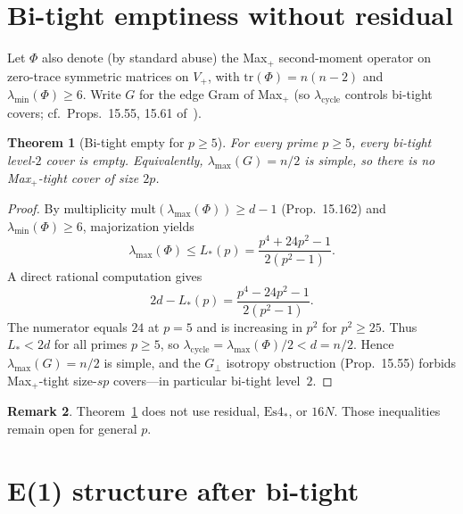 \documentclass[11pt,a4paper]{article}
\theoremstyle{plain}
\newtheorem{theorem}{Theorem}[section]
\theoremstyle{definition}
\newtheorem{remark}[theorem]{Remark}
\begin{document}
\section{Bi-tight emptiness without residual}
\label{sec:bitight}

Let $\Phi$ also denote (by standard abuse) the Max$_+$ second-moment operator on zero-trace
symmetric matrices on $V_+$, with $\mathrm{tr}(\Phi)=n(n-2)$ and $\lambda_{\min}(\Phi)\ge6$.
Write $G$ for the edge Gram of Max$_+$ (so $\lambda_{\mathrm{cycle}}$ controls bi-tight
covers; cf.\ Props.\ 15.55, 15.61 of~\cite{solution-repo}).

\begin{theorem}[Bi-tight empty for $p\ge5$]
\label{thm:bitight}
For every prime $p\ge5$, every bi-tight level-$2$ cover is empty. Equivalently,
$\lambda_{\max}(G)=n/2$ is simple, so there is no Max$_+$-tight cover of size $2p$.
\end{theorem}

\begin{proof}
By multiplicity mult$(\lambda_{\max}(\Phi))\ge d-1$ (Prop.\ 15.162) and
$\lambda_{\min}(\Phi)\ge6$, majorization yields
\begin{equation}
\label{eq:Lstar}
\lambda_{\max}(\Phi)\le L_*(p)=\frac{p^4+24p^2-1}{2(p^2-1)}.
\end{equation}
A direct rational computation gives
\[
2d-L_*(p)=\frac{p^4-24p^2-1}{2(p^2-1)}.
\]
The numerator equals $24$ at $p=5$ and is increasing in $p^2$ for $p^2\ge25$.
Thus $L_*<2d$ for all primes $p\ge5$, so
$\lambda_{\mathrm{cycle}}=\lambda_{\max}(\Phi)/2<d=n/2$.
Hence $\lambda_{\max}(G)=n/2$ is simple, and the $G_\perp$ isotropy obstruction
(Prop.\ 15.55) forbids Max$_+$-tight size-$sp$ covers---in particular bi-tight level~$2$.
\end{proof}

\begin{remark}
Theorem~\ref{thm:bitight} does not use residual, $\mathrm{Es4}_*$, or $16N$.
Those inequalities remain open for general $p$.
\end{remark}

\section{E(1) structure after bi-tight}
\label{sec:e1struct}
\end{document}
